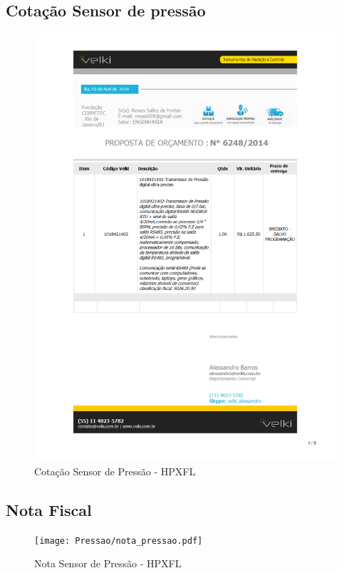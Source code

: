 \subsection{Cotação Sensor de pressão}
\begin{figure}[H]
 \centering
 \includegraphics[width=1\columnwidth]{Pressao/price_quote.pdf}
 \caption{Cotação Sensor de Pressão - HPXFL }
\end{figure}

\subsection{Nota Fiscal}
\begin{figure}[H]
 \centering
 \texttt{[image: Pressao/nota\_pressao.pdf]}
 \caption{Nota Sensor de Pressão - HPXFL}
 \end{figure}